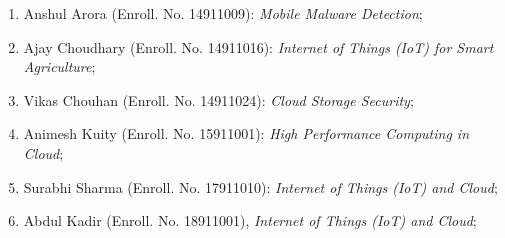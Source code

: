 	\begin{enumerate}%
			\item Anshul Arora (Enroll. No. 14911009): \textit{Mobile Malware Detection};
			\item Ajay Choudhary (Enroll. No. 14911016): \textit{Internet of Things (IoT) for Smart Agriculture};
			\item Vikas Chouhan (Enroll. No. 14911024): \textit{Cloud Storage Security};
			\item Animesh Kuity (Enroll. No. 15911001): \textit{High Performance Computing in Cloud};			
			\item Surabhi Sharma (Enroll. No. 17911010): \textit{Internet of Things (IoT) and Cloud};	
			\item Abdul Kadir (Enroll. No. 18911001), \textit{Internet of Things (IoT) and Cloud};	 
	\end{enumerate}